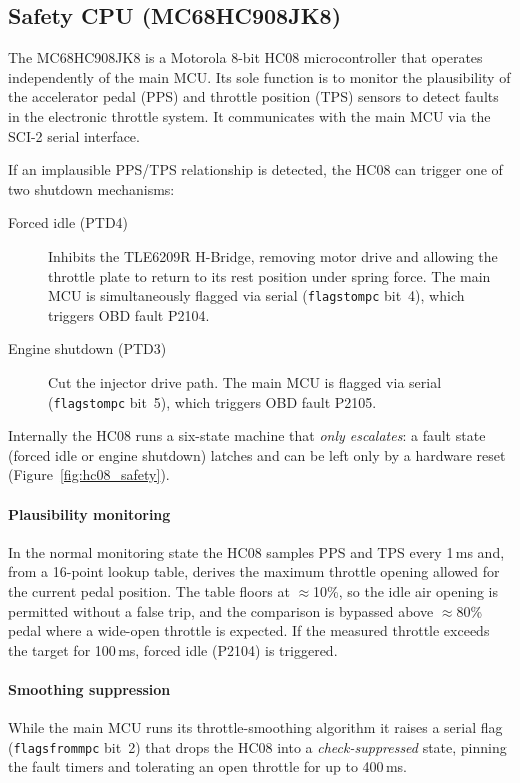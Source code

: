\documentclass[a4paper,11pt]{article}
\renewcommand{\_}{\oldunderscore\allowbreak}
\begin{document}
\subsection{Safety CPU (MC68HC908JK8)}\label{sec:safety-cpu}

The MC68HC908JK8 is a Motorola 8-bit HC08 microcontroller that operates
independently of the main MCU. Its sole function is to monitor the plausibility
of the accelerator pedal (PPS) and throttle position (TPS) sensors to detect
faults in the electronic throttle system. It communicates with the main MCU via
the SCI-2 serial interface.

If an implausible PPS/TPS relationship is detected, the HC08 can trigger one of
two shutdown mechanisms:

\begin{description}
\item[Forced idle (PTD4)] Inhibits the TLE6209R H-Bridge, removing motor drive
  and allowing the throttle plate to return to its rest position under spring
  force. The main MCU is simultaneously flagged via serial
  (\texttt{flags\_to\_mpc} bit~4), which triggers OBD fault P2104.
\item[Engine shutdown (PTD3)] Cut the injector drive path. The main MCU is
  flagged via serial
  (\texttt{flags\_to\_mpc} bit~5), which triggers OBD fault P2105.
\end{description}

Internally the HC08 runs a six-state machine that \emph{only escalates}: a fault
state (forced idle or engine shutdown) latches and can be left only by a hardware
reset (Figure~\ref{fig:hc08_safety}).

\paragraph{Plausibility monitoring} In the normal monitoring state the HC08
samples PPS and TPS every 1\,ms and, from a 16-point lookup table, derives the
maximum throttle opening allowed for the current pedal position. The table floors
at $\approx$10\%, so the idle air opening is permitted without a false trip, and
the comparison is bypassed above $\approx$80\% pedal where a wide-open throttle is
expected. If the measured throttle exceeds the target for 100\,ms, forced idle
(P2104) is triggered.

\paragraph{Smoothing suppression} While the main MCU runs its throttle-smoothing
algorithm it raises a serial flag (\texttt{flags\_from\_mpc} bit~2) that drops the
HC08 into a \emph{check-suppressed} state, pinning the fault timers and tolerating
an open throttle for up to 400\,ms.
\end{document}
